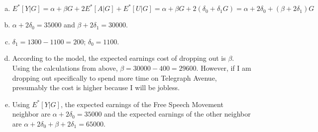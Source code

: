 \documentclass{article}[12pt]
\begin{document}
\setcounter{section}{9}
\section{}
\begin{enumerate}[(a)]
	\item $E^*[Y|G] = \alpha + \beta G + 2 E^*[A|G] + E^*[U|G] = \alpha + \beta G + 2 (\delta_0 + \delta_1 G) = \alpha + 2\delta_0 + (\beta + 2\delta_1)G$
	\item $\alpha + 2 \delta_0 = 35000$ and $\beta + 2\delta_1 = 30000$.
	\item $\delta_1 = 1300 - 1100 = 200$; $\delta_0 = 1100$.
	\item According to the model, the expected earnings cost of dropping out is $\beta$. Using the calculations from above, $\beta = 30000 - 400 = 29600$. However, if I am dropping out specifically to spend more time on Telegraph Avenue, presumably the cost is higher because I will be jobless.
	\item Using $E^*[Y|G]$, the expected earnings of the Free Speech Movement neighbor are $\alpha + 2\delta_0 = 35000$ and the expected earnings of the other neighbor are $\alpha + 2\delta_0 + \beta + 2 \delta_1 = 65000$.
\end{enumerate}

\setcounter{section}{14}
\end{document}
